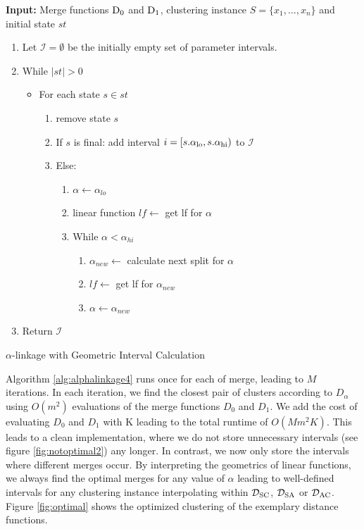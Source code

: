 \begin{algorithm}
    \textbf{Input:} Merge functions $\operatorname{D_{0}}$ and $\operatorname{D_{1}}$, clustering instance $S = \{x_1, \dots, x_n\}$ and initial state $st$
    \begin{enumerate}[nosep, leftmargin=*]
    \item Let $\mathcal{I} = \emptyset$ be the initially empty set of parameter intervals.
    \item While $|st| > 0$
    \begin{itemize}[nosep, leftmargin=*]
        \item For each state $s \in st$
        \begin{enumerate}
            \item remove state $s$\;
            \item If $s$ is final: add interval $i = [s.\alpha_\text{lo}, s.\alpha_\text{hi})$ to $\mathcal{I}$
            \item Else: 
            \begin{enumerate}
                \item $\alpha \gets \alpha_{lo}$\;
                \item linear function $lf \gets$ get lf for $\alpha$
                \item While $\alpha < \alpha_{hi}$
                \begin{enumerate}
                    \item $\alpha_{new} \gets$ calculate next split for $\alpha$
                    \item $lf \gets$ get lf for $\alpha_{new}$\;
                    \item $\alpha \gets \alpha_{new}$
                \end{enumerate}
            \end{enumerate}
        \end{enumerate}
    \end{itemize}
    \item Return $\mathcal{I}$
    \end{enumerate}
    \caption{$\alpha$-linkage with Geometric Interval Calculation}
    \label{alg:alphalinkage4}
\end{algorithm}

Algorithm \ref{alg:alphalinkage4} runs once for each of merge, leading to $M$ iterations. In each iteration, we find the closest pair of clusters according to $D_\alpha$ using $O(m^2)$ evaluations of the merge functions $D_0$ and $D_1$. We add the cost of evaluating $D_0$ and $D_1$ with K leading to the total runtime of $O(Mm^2K)$. This leads to a clean implementation, where we do not store unnecessary intervals (see figure \ref{fig:notoptimal2}) any longer. In contrast, we now only store the intervals where different merges occur. By interpreting the geometrics of linear functions, we always find the optimal merges for any value of $\alpha$ leading to well-defined intervals for any clustering instance interpolating within $\mathcal{D}_\text{SC}$, $\mathcal{D}_\text{SA}$ or $\mathcal{D}_\text{AC}$. Figure \ref{fig:optimal} shows the optimized clustering of the exemplary distance functions.

